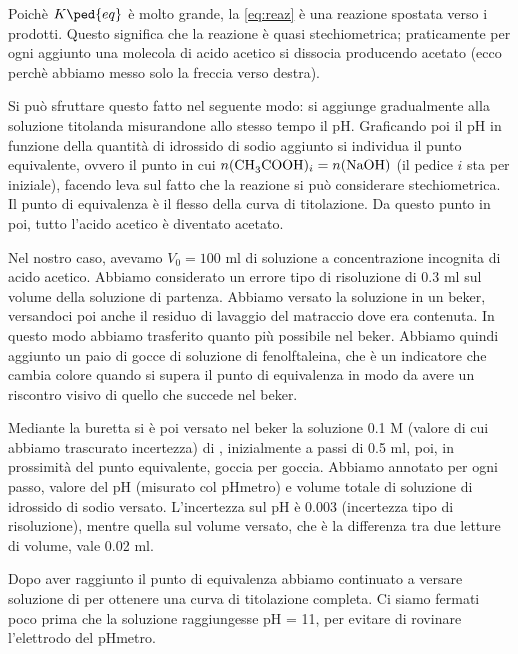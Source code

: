 Poichè $K\ped{eq}$ è molto grande, la \eqref{eq:reaz} è una reazione spostata verso i prodotti. Questo significa che la reazione
è quasi stechiometrica; praticamente per ogni  aggiunto una molecola di acido acetico si dissocia producendo acetato
(ecco perchè abbiamo messo solo la freccia verso destra).

Si può sfruttare questo fatto nel seguente modo: si aggiunge gradualmente  alla soluzione titolanda misurandone allo
stesso tempo il pH. Graficando poi il pH in funzione della quantità di idrossido di sodio aggiunto si individua
il punto equivalente, ovvero il punto in cui $n(\ce{CH3COOH})_i = n(\ce{NaOH})$ (il pedice $i$ sta per iniziale),
facendo leva sul fatto che la reazione si può considerare stechiometrica. Il punto di equivalenza è
il flesso della curva di titolazione. Da questo punto in poi, tutto l'acido acetico è diventato acetato.

Nel nostro caso, avevamo $V_0 = 100$ ml di soluzione a concentrazione incognita di acido acetico. Abbiamo
considerato un errore tipo di risoluzione di 0.3 ml sul volume della soluzione di partenza. Abbiamo versato la soluzione in un
beker, versandoci poi anche il residuo di lavaggio del matraccio dove era contenuta. In questo modo abbiamo
trasferito quanto più  possibile nel beker. Abbiamo quindi aggiunto un paio di gocce
di soluzione di fenolftaleina, che è un indicatore che cambia colore quando si supera il punto di equivalenza
in modo da avere un riscontro visivo di quello che succede nel beker.

Mediante la buretta si è poi versato nel beker la soluzione 0.1 M (valore di cui abbiamo trascurato incertezza)
di , inizialmente a
passi di 0.5 ml, poi, in prossimità del punto equivalente, goccia per goccia. Abbiamo annotato per ogni passo, valore
del pH (misurato col pHmetro) e volume totale di soluzione di idrossido di sodio versato. L'incertezza sul pH è 0.003
(incertezza tipo di risoluzione), mentre quella sul volume versato, che è la differenza tra due letture di volume,
vale 0.02 ml. 

Dopo aver raggiunto il punto di equivalenza abbiamo continuato a versare soluzione di  per
ottenere una curva di titolazione completa. Ci siamo fermati poco prima che la soluzione raggiungesse pH = 11,
per evitare di rovinare l'elettrodo del pHmetro.
